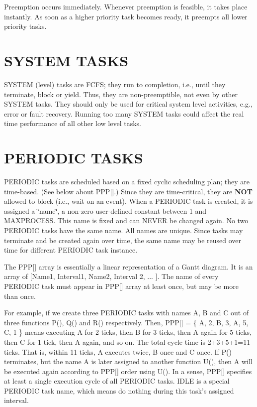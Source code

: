 Preemption occurs immediately. Whenever preemption is feasible, it takes place instantly. As soon as a higher priority task becomes ready, it preempts all lower priority tasks.\section{SYSTEM TASKS}\label{index_system}
SYSTEM (level) tasks are FCFS; they run to completion, i.e., until they terminate, block or yield. Thus, they are non-preemptible, not even by other SYSTEM tasks. They should only be used for critical system level activities, e.g., error or fault recovery. Running too many SYSTEM tasks could affect the real time performance of all other low level tasks.\section{PERIODIC TASKS}\label{index_periodic}
PERIODIC tasks are scheduled based on a fixed cyclic scheduling plan; they are time-based. (See below about PPP[].) Since they are time-critical, they are {\bf NOT} allowed to block (i.e., wait on an event). When a PERIODIC task is created, it is assigned a \char`\"{}name\char`\"{}, a non-zero user-defined constant between 1 and MAXPROCESS. This name is fixed and can NEVER be changed again. No two PERIODIC tasks have the same name. All names are unique. Since tasks may terminate and be created again over time, the same name may be reused over time for different PERIODIC task instance.

The PPP[] array is essentially a linear representation of a Gantt diagram. It is an array of [Name1, Interval1, Name2, Interval 2, ... ]. The name of every PERIODIC task must appear in PPP[] array at least once, but may be more than once.

For example, if we create three PERIODIC tasks with names A, B and C out of three functions P(), Q() and R() respectively. Then, PPP[] = \{ A, 2, B, 3, A, 5, C, 1 \} means executing A for 2 ticks, then B for 3 ticks, then A again for 5 ticks, then C for 1 tick, then A again, and so on. The total cycle time is 2+3+5+1=11 ticks. That is, within 11 ticks, A executes twice, B once and C once. If P() terminates, but the name A is later assigned to another function U(), then A will be executed again according to PPP[] order using U(). In a sense, PPP[] specifies at least a single execution cycle of all PERIODIC tasks. IDLE is a special PERIODIC task name, which means do nothing during this task's assigned interval.

